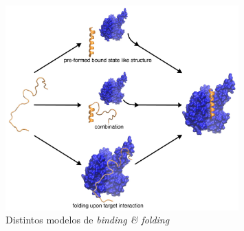 \begin{figure}[h]
\centering
\includegraphics[width=0.8\textwidth]{img/PSE-MoRE.jpg} 
\caption{Distintos modelos de \textit{binding \& folding}} 
\label{idpBinding}
\end{figure}




